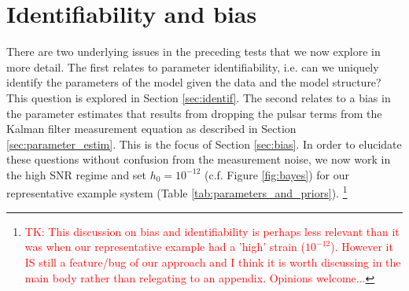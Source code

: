 \documentclass[fleqn,usenatbib,useAMS]{mnras}
\begin{document}
\section{Identifiability and bias} \label{sec:bias_and_identifiability}
There are two underlying issues in the preceding tests that we now explore in more detail. The first relates to parameter identifiability, i.e. can we uniquely identify the parameters of the model given the data and the model structure? This question is explored in Section \ref{sec:identif}. The second relates to a bias in the parameter estimates that results from dropping the pulsar terms from the Kalman filter measurement equation as described in Section \ref{sec:parameter_estim}. This is the focus of Section \ref{sec:bias}. In order to elucidate these questions without confusion from the measurement noise, we now work in the high SNR regime and set $h_0 = 10^{-12}$ (c.f. Figure \ref{fig:bayes}) for our representative example system (Table \ref{tab:parameters_and_priors}). \footnote{\tiny \textcolor{red}{TK: This discussion on bias and identifiability is perhaps less relevant than it was when our representative example had a 'high' strain ($10^{-12}$). However it IS still a feature/bug of our approach and I think it is worth discussing in the main body rather than relegating to an appendix. Opinions welcome...} \normalsize}
\end{document}
